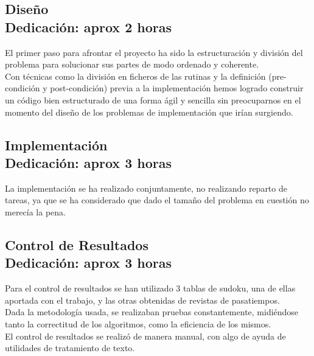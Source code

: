 \documentclass[12pt,letterpaper]{article}
\begin{document}
\subsection{Diseño\\ {\small Dedicaci\'on: aprox 2 horas}}
El primer paso para afrontar el proyecto ha sido la estructuraci\'on y
divisi\'on del problema para solucionar sus partes de modo ordenado
y coherente.\\
Con t\'ecnicas como la divisi\'on en ficheros de las rutinas y la
definici\'on (pre-condici\'on y post-condici\'on) previa a la implementaci\'on
hemos logrado construir un c\'odigo bien estructurado de una forma \'agil
y sencilla sin preocuparnos en el momento del diseño de los problemas
de implementaci\'on que ir\'ian surgiendo.
\subsection{Implementaci\'on\\ {\small Dedicaci\'on: aprox 3 horas}}
La implementaci\'on se ha realizado conjuntamente, no realizando
reparto de tareas, ya que se ha considerado que dado el tama\~no del
problema en cuesti\'on no merec\'ia la pena.
\subsection{Control de Resultados\\ {\small Dedicaci\'on: aprox 3 horas}}
Para el control de resultados se han utilizado 3 tablas de sudoku, una
de ellas aportada con el trabajo, y las otras obtenidas de revistas de
pasatiempos.\\
Dada la metodolog\'ia usada, se realizaban pruebas constantemente,
midi\'endose tanto la correctitud de los algoritmos, como la eficiencia
de los mismos.\\
El control de resultados se realiz\'o de manera manual, con algo de
ayuda de utilidades de tratamiento de texto.
\end{document}
